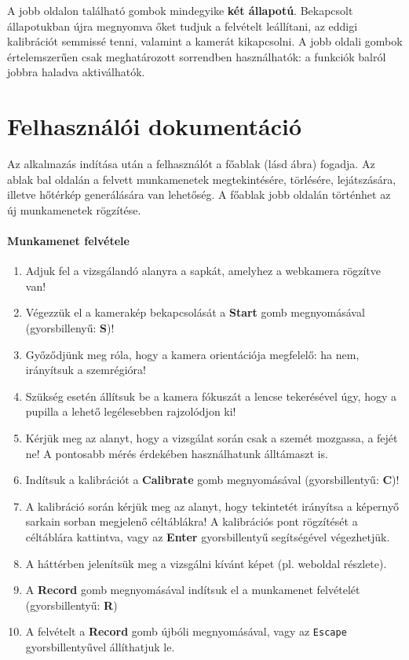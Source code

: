\bigskip

A jobb oldalon található gombok mindegyike \textbf{két állapotú}. Bekapcsolt állapotukban újra megnyomva őket tudjuk a felvételt leállítani, az eddigi kalibrációt semmissé tenni, valamint a kamerát kikapcsolni. A jobb oldali gombok értelemszerűen csak meghatározott sorrendben használhatók: a funkciók balról jobbra haladva aktiválhatók.

\section{Felhasználói dokumentáció}\label{sect:docs}

Az alkalmazás indítása után a felhasználót a főablak (lásd  ábra) fogadja. Az ablak bal oldalán a felvett munkamenetek megtekintésére, törlésére, lejátszására, illetve hőtérkép generálására van lehetőség. A főablak jobb oldalán történhet az új munkamenetek rögzítése.

\paragraph{Munkamenet felvétele}

\begin{enumerate}
  \item Adjuk fel a vizsgálandó alanyra a sapkát, amelyhez a webkamera rögzítve van!
  \item Végezzük el a kamerakép bekapcsolását a \textbf{Start} gomb megnyomásával (gyorsbillenyű: \textbf{S})!
  \item Győződjünk meg róla, hogy a kamera orientációja megfelelő: ha nem, irányítsuk a szemrégióra!
  \item Szükség esetén állítsuk be a kamera fókuszát a lencse tekerésével úgy, hogy a pupilla a lehető legélesebben rajzolódjon ki!
  \item Kérjük meg az alanyt, hogy a vizsgálat során csak a szemét mozgassa, a fejét ne! A pontosabb mérés érdekében használhatunk álltámaszt is.
  \item Indítsuk a kalibrációt a \textbf{Calibrate} gomb megnyomásával (gyorsbillentyű: \textbf{C})!
  \item A kalibráció során kérjük meg az alanyt, hogy tekintetét irányítsa a képernyő sarkain sorban megjelenő céltáblákra! A kalibrációs pont rögzítését a céltáblára kattintva, vagy az \textbf{Enter} gyorsbillentyű segítségével végezhetjük.
  \item A háttérben jelenítsük meg a vizsgálni kívánt képet (pl. weboldal részlete).
  \item A \textbf{Record} gomb megnyomásával indítsuk el a munkamenet felvételét (gyorsbillentyű: \textbf{R})
  \item A felvételt a \textbf{Record} gomb újbóli megnyomásával, vagy az \texttt{Escape} gyorsbillentyűvel állíthatjuk le.
\end{enumerate}

